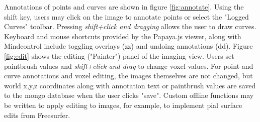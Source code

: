 Annotations of points and curves are shown in figure \ref{fig:annotate}. Using the shift key, users may click on the image to annotate points or select the "Logged Curves" toolbar. Pressing \textit{shift+click and dragging} allows the user to draw curves. Keyboard and mouse shortcuts provided by the Papaya.js viewer, along with Mindcontrol include toggling overlays (zz) and undoing annotations (dd). Figure \ref{fig:edit} shows the editing ("Painter") panel of the imaging view. Users set paintbrush values and \textit{shift+click and drag} to change voxel values. For point and curve annotations and voxel editing, the images themselves are not changed, but world x,y,z coordinates along with annotation text or paintbrush values are saved to the mongo database when the user clicks "save". Custom offline functions may be written to apply editing to images, for example, to implement pial surface edits from Freesurfer. 